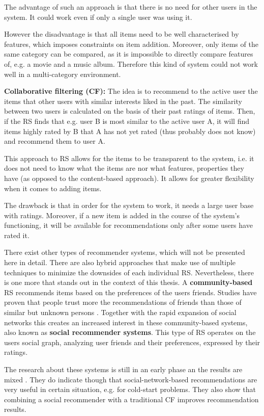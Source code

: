 \documentclass[12pt]{report}
\begin{document}
The advantage of such an approach is that there is no need for other users in the system. It could work even if only a single user was using it.

However the disadvantage is that all items need to be well characterised by features, which imposes constraints on item addition. Moreover, only items of the same category can be compared, as it is impossible to directly compare features of, e.g. a movie and a music album. Therefore this kind of system could not work well in a multi-category environment.

\hbox{}
{\bf Collaborative filtering (CF):} The idea is to recommend to the active user the items that other users with similar interests liked in the past. The similarity between two users is calculated on the basis of their past ratings of items. Then, if the RS finds that e.g. user B is most similar to the active user A, it will find items highly rated by B that A has not yet rated (thus probably does not know) and recommend them to user A.

This approach to RS allows for the items to be transparent to the system, i.e. it does not need to know what the items are nor what features, properties they have (as opposed to the content-based approach). It allows for greater flexibility when it comes to adding items.

The drawback is that in order for the system to work, it needs a large user base with ratings. Moreover, if a new item is added in the course of the system's functioning, it will be available for recommendations only after some users have rated it.

\hbox{}
There exist other types of recommender systems, which will not be presented here in detail. There are also hybrid approaches that make use of multiple techniques to minimize the downsides of each individual RS. 
Nevertheless, there is one more that stands out in the context of this thesis. A {\bf community-based} RS recommends items based on the preferences of the users friends. Studies have proven that people trust more the recommendations of friends than those of similar but unknown persons \cite{sinha}. Together with the rapid expansion of social networks this creates an increased interest in these community-based systems, also known as {\bf social recommender systems}. This type of RS operates on the users social graph, analyzing user friends and their preferences, expressed by their ratings.

The research about these systems is still in an early phase an the results are mixed \cite{rec_sys_handbook}. They do indicate though that social-network-based recommendations are very useful in certain situation, e.g. for cold-start problems. They also show that combining a social recommender with a traditional CF improves recommendation results.
\end{document}

